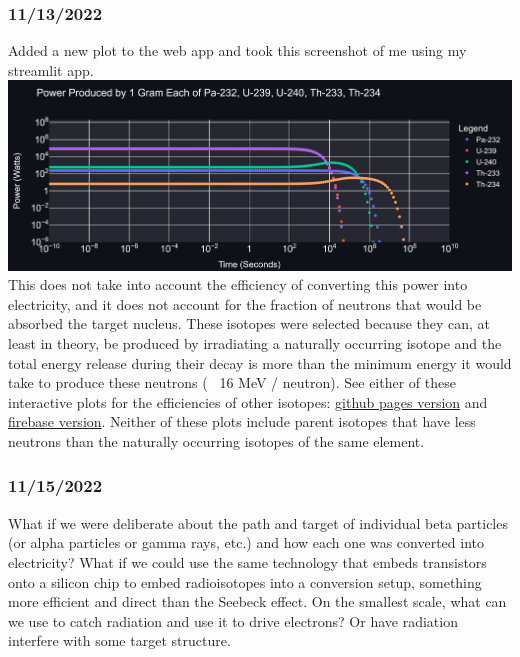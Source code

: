 \documentclass[12pt]{article}
\begin{document}
\subsubsection{11/13/2022}
Added a new plot to the web app and took this screenshot of me using my streamlit app. \\
\includegraphics[scale=.6]{Images/newplot(4).png}\\
This does not take into account the efficiency of converting this power into electricity, and it does not account for the fraction of neutrons that would be absorbed the target nucleus. These isotopes were selected because they can, at least in theory, be produced by irradiating a naturally occurring isotope and the total energy release during their decay is more than the minimum energy it would take to produce these neutrons (~ 16 MeV / neutron). See either of these interactive plots for the efficiencies of other isotopes: \href{https://marcosp7635.github.io/plots/keV_per_neutron.html}{github pages version} and \href{https://mp7635plots.web.app/keV_per_neutron.html}{firebase version}. Neither of these plots include parent isotopes that have less neutrons than the naturally occurring isotopes of the same element. 
\subsubsection{11/15/2022}
What if we were deliberate about the path and target of individual beta particles (or alpha particles or gamma rays, etc.) and how each one was converted into electricity? What if we could use the same technology that embeds transistors onto a silicon chip to embed radioisotopes into a conversion setup, something more efficient and direct than the Seebeck effect. On the smallest scale, what can we use to catch radiation and use it to drive electrons? Or have radiation interfere with some target structure. 
\end{document}

